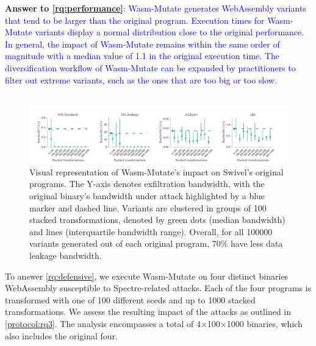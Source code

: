\documentclass[a4paper,fleqn]{cas-dc}
\newcommand*\badge[1]{ \colorbox{red}{\color{white}#1}}
\newcommand{\tool}{{\sc Wasm-Mutate}\xspace}
\newcommand{\Wasm}{WebAssembly\xspace}
\newcommand{\wasm}{\Wasm}
\newenvironment{revision1}{\color{blue}}{}
\newcommand{\revision}[1]{\textcolor{blue}{#1}}
\newcommand{\todo}[1]{%
\refstepcounter{todo}
\noindent\textbf{\badge{TODO}} {\color{red}#1}
\addcontentsline{td}{todo}
{\color{red}\thesection.\thetodo\xspace #1}}
\begin{document}
\begin{revision1}
\vspace{-0.1cm}

\begin{tcolorbox}[boxrule=1pt,arc=.3em,boxsep=-1.3mm]
  \textbf{Answer to \ref{rq:performance}}: 
    \revision{
    \tool generates \Wasm variants that tend to be larger than the original program. 
    Execution times for \tool variants display a normal distribution close to the original performance.
    In general, the impact of \tool remains within the same order of magnitude with a median value of 1.1 in the original execution time. 
    The diversification workflow of \tool can be expanded by practitioners to filter out extreme variants, such as the ones that are too big or too slow. 
    }
\end{tcolorbox}

\end{revision1}

\subsection{\rqdefensive}

\begin{figure}
    \centering
    \includegraphics[width=\linewidth]{plots/rq3/results.rq3.pdf}
    \caption{Visual representation of \tool's impact on Swivel's original programs. The Y-axis denotes exfiltration bandwidth, with the original binary's bandwidth under attack highlighted by a blue marker and dashed line. Variants are clustered in groups of 100 stacked transformations, denoted by green dots (median bandwidth) and lines (interquartile bandwidth range). Overall, for all 100000 variants generated out of each original program, 70\% have less data leakage bandwidth.}
  \label{attacks:impact}
\end{figure}


To answer \ref{rq:defensive}, we execute \tool on four distinct binaries \wasm susceptible to Spectre-related attacks. Each of the four programs is transformed with one of 100 different seeds and up to 1000 stacked transformations. 
We assess the resulting impact of the attacks as outlined in \ref{protocol:rq3}. 
The analysis encompasses a total of 4$\times$100$\times$1000 binaries, which also includes the original four.
\end{document}
